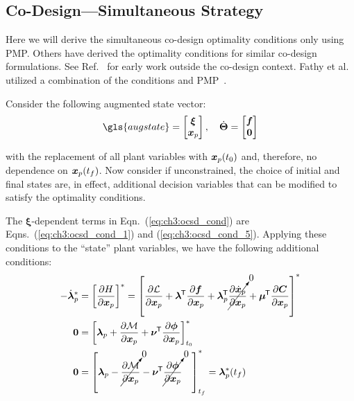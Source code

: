 \subsection{Co-Design---Simultaneous Strategy}

Here we will derive the simultaneous co-design optimality conditions only using PMP.
Others have derived the optimality conditions for similar co-design formulations.
See Ref.~\cite{Dolezal1981a} for early work outside the co-design context.
Fathy et al. utilized a combination of the  conditions and PMP~\cite{Fathy2001a}.

Consider the following augmented state vector:
\begin{align}
\label{eq:ch3:augmented_states}
\gls{augstate} = \begin{bmatrix} \bxi \\ \bxp \end{bmatrix}, \quad \dot{\bm{\Theta}} = \begin{bmatrix} \bfd \\ \bzero \end{bmatrix}
\end{align}

\noindent with the replacement of all plant variables with $\bm{x}_p(t_0)$ and, therefore, no dependence on $\bm{x}_p(t_f)$. Now consider if unconstrained, the choice of initial and final states are, in effect, additional decision variables that can be modified to satisfy the optimality conditions.

The $\bm{\xi}$-dependent terms in Eqn.~(\ref{eq:ch3:ocsd_cond}) are Eqns.~(\ref{eq:ch3:ocsd_cond_1}) and (\ref{eq:ch3:ocsd_cond_5}). Applying these conditions to the ``state'' plant variables, we have the following additional conditions:
\begin{subequations}
\begin{align}
-\dot{\bm{\lambda}}^*_p &= \left[ \frac{\partial H}{\partial \bm{x}_p} \right]^* = \left[ \frac{\partial \mathcal{L}}{\partial \bm{x}_p}  + \bm{\lambda}^{\mkern-1.5mu\mathsf{T}} \frac{\partial \bm{f}}{\partial \bm{x}_p} + \bm{\lambda}_p^{\mkern-1.5mu\mathsf{T}} \cancelto{0}{\frac{\partial \dot{\bm{x}}_p}{\partial \bm{x}_p}} + \bm{\mu}^{\mkern-1.5mu\mathsf{T}} \frac{\partial \bm{C}}{\partial \bm{x}_p} \right]^*
  \\
\bm{0} &= \left[ \bm{\lambda}_p + \frac{\partial \mathcal{M}}{\partial \bm{x}_p} + \bm{\nu}^{\mkern-1.5mu\mathsf{T}} \frac{\partial \bm{\phi}}{\partial \bm{x}_p} \right]_{t_0}^*  \\
\bm{0} &= \left[ \bm{\lambda}_p - \cancelto{0}{\frac{\partial \mathcal{M}}{\partial \bm{x}_p}} - \bm{\nu}^{\mkern-1.5mu\mathsf{T}} \cancelto{0}{\frac{\partial \bm{\phi}}{\partial \bm{x}_p}} \quad \right]_{t_f}^* = \bm{\lambda}_p^*(t_f)
\end{align}
\end{subequations}

